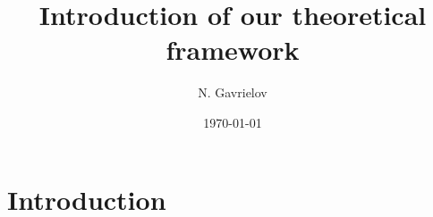 \documentclass[aps,prl,reprint,groupedaddress]{revtex4-1}  %
\begin{document}
\title{Introduction of our theoretical framework}


\author{N. Gavrielov}
\affiliation{}


\date{\today}

\begin{abstract}
\end{abstract}

\pacs{}

\maketitle


\section{Introduction}
\end{document}
